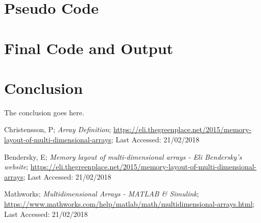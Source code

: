 \documentclass[10pt, conference]{IEEEtran}
\begin{document}
\section{Pseudo Code}
\label{Pseudo Code}

\section{Final Code and Output}
\label{Final Code and Output}


\section{Conclusion}
\label{Conclusion}
The conclusion goes here.



\begin{thebibliography}{}

Christensson, P; \emph{Array Definition}; \url{https://eli.thegreenplace.net/2015/memory-layout-of-multi-dimensional-arrays}; Last Accessed: 21/02/2018

Bendersky, E; \emph{Memory layout of multi-dimensional arrays - Eli Bendersky's website}; \url{https://eli.thegreenplace.net/2015/memory-layout-of-multi-dimensional-arrays}; Last Accessed: 21/02/2018

Mathworks; \emph{Multidimensional Arrays - MATLAB \& Simulink}; \url{https://www.mathworks.com/help/matlab/math/multidimensional-arrays.html}; Last Accessed: 21/02/2018

\end{thebibliography}
\end{document}
